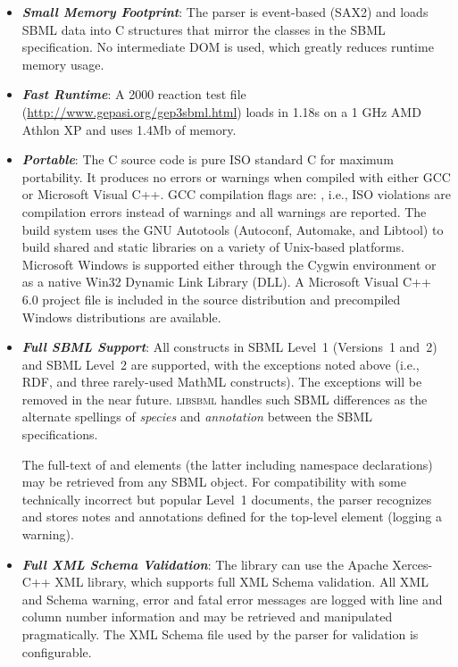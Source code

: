 \documentclass{sbmlmanual}
\newcommand{\libsbml}{\textsc{libsbml}}
\begin{document}
\begin{itemize}
  
\item \textbf{\textsl{Small Memory Footprint}}:  The parser is event-based (SAX2)
  and loads SBML data into C structures that mirror the classes in the SBML
  specification.  No intermediate DOM is used, which greatly reduces
  runtime memory usage.
  
\item \textbf{\textsl{Fast Runtime}}:  A 2000 reaction test file
  (\url{http://www.gepasi.org/gep3sbml.html}) loads in 1.18s on a 1 GHz AMD
  Athlon XP and uses 1.4Mb of memory.
  
\item \textbf{\textsl{Portable}}:  The C source code is pure ISO standard C for
  maximum portability.  It produces no errors or warnings when compiled
  with either GCC or Microsoft Visual C++.  GCC compilation flags are:
  , i.e., ISO violations are
  compilation errors instead of warnings and all warnings are reported.
  The build system uses the GNU Autotools (Autoconf, Automake, and Libtool)
  to build shared and static libraries on a variety of Unix-based
  platforms.  Microsoft Windows is supported either through the Cygwin
  environment or as a native Win32 Dynamic Link Library (DLL).  A Microsoft
  Visual C++ 6.0 project file is included in the source distribution and 
  precompiled Windows distributions are available.
  
\item \textbf{\textsl{Full SBML Support}}:  All constructs in SBML Level~1
  (Versions~1 and~2) and SBML Level~2 are supported, with the exceptions
  noted above (i.e., RDF, and three rarely-used MathML constructs).  The
  exceptions will be removed in the near future.  \libsbml{} handles such
  SBML differences as the alternate spellings of \emph{species} and
  \emph{annotation} between the SBML specifications.
  
  The full-text of  and  elements (the
  latter including namespace declarations) may be retrieved from any
  SBML object.  For compatibility with some technically incorrect but
  popular Level~1 documents, the parser recognizes and stores notes
  and annotations defined for the top-level  element (logging
  a warning).
  
\item \textbf{\textsl{Full XML Schema Validation}}: The library can use the Apache
  Xerces-C++ XML library, which supports full XML Schema validation.  All
  XML and Schema warning, error and fatal error messages are logged with
  line and column number information and may be retrieved and manipulated
  pragmatically.  The XML Schema file used by the parser for validation is
  configurable.
  

\end{itemize}
\end{document}
